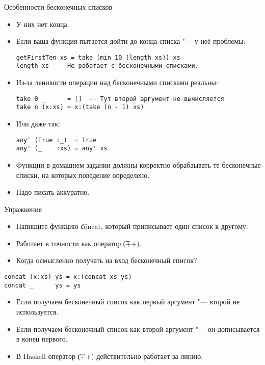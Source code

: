 \begin{frame}[fragile]{Особенности бесконечных списков}
	\begin{itemize}
		\item У них нет конца.
		\item Если ваша функция пытается дойти до конца списка "--- у неё проблемы:
\begin{verbatim}
getFirstTen xs = take (min 10 (length xs)) xs
length xs  -- Не работает с бесконечными списками.
\end{verbatim}
		\item Из-за ленивости операции над бесконечными списками реальны:
\begin{verbatim}
take 0 _      = []  -- Тут второй аргумент не вычисляется
take n (x:xs) = x:(take (n - 1) xs)
\end{verbatim}
		\item Или даже так:
\begin{verbatim}
any' (True :_)  = True
any' (_    :xs) = any' xs
\end{verbatim}
		\item Функции в домашнем задании должны корректно обрабаывать те бесконечные списки, на которых поведение определено.
		\item Надо писать аккуратно.
	\end{itemize}
\end{frame}

\begin{frame}[fragile]{Упражнение}
	\begin{itemize}
		\item Напишите функцию \t{concat}, который приписывает один список к другому.
		\item Работает в точности как оператор \t{(++)}.
		\item Когда осмысленно получать на вход бесконечный список?
	\end{itemize}
	\pause
\begin{verbatim}
concat (x:xs) ys = x:(concat xs ys)
concat _      ys = ys
\end{verbatim}
	\begin{itemize}
		\item Если получаем бесконечный список как первый аргумент "--- второй не используется.
		\item Если получаем бесконечный список как второй аргумент "--- он дописывается в конец первого.
		\item В Haskell оператор \t{(++)} действительно работает за линию.
	\end{itemize}
\end{frame}
